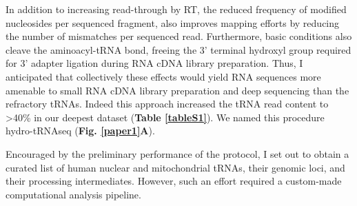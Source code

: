 \documentclass[12pt]{rockefeller}
\begin{document}
In addition to increasing read-through by RT, the reduced frequency of modified nucleosides per sequenced fragment, also improves mapping efforts by reducing the number of mismatches per sequenced read. Furthermore, basic conditions also cleave the aminoacyl-tRNA bond, freeing the 3’ terminal hydroxyl group required for 3’ adapter ligation during RNA cDNA library preparation. Thus, I anticipated that collectively these effects would yield RNA sequences more amenable to small RNA cDNA library preparation and deep sequencing than the refractory tRNAs. Indeed this approach increased the tRNA read content to >40\% in our deepest dataset (\textbf{Table \ref{tableS1}}). We named this procedure hydro-tRNAseq (\textbf{Fig. \ref{paper1}A}).

Encouraged by the preliminary performance of the protocol, I set out to obtain a curated list of human nuclear and mitochondrial tRNAs, their genomic loci,  and their processing intermediates. However, such an effort required a custom-made computational analysis pipeline.
\end{document}
